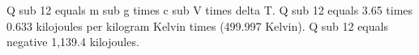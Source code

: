 Q sub 12 equals m sub g times c sub V times delta T.  
Q sub 12 equals 3.65 times 0.633 kilojoules per kilogram Kelvin times (499.997 Kelvin).  
Q sub 12 equals negative 1,139.4 kilojoules.